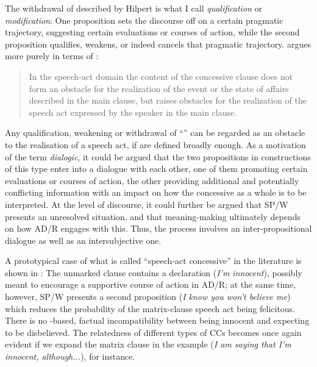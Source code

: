 The withdrawal of  described by Hilpert is what I call \textit{qualification} or \textit{modification}: One proposition sets the discourse off on a certain pragmatic trajectory, suggesting certain evaluations or courses of action, while the second proposition qualifies, weakens, or indeed cancels that pragmatic trajectory. \citet[318]{Crevels2000} argues more purely in terms of :

\begin{quote}
In the speech-act domain the content of the concessive clause does not form an obstacle for the realization of the event or the state of affairs described in the main clause, but raises obstacles for the realization of the speech act expressed by the speaker in the main clause.
\end{quote}

Any qualification, weakening or withdrawal of “” \citep[167]{Hilpert2013a} can be regarded as an obstacle to the realisation of a speech act, if  are defined broadly enough. As a motivation of the term \textit{dialogic}, it could be argued that the two propositions in constructions of this type enter into a dialogue with each other, one of them promoting certain evaluations or courses of action, the other providing additional and potentially conflicting information with an impact on how the concessive as a whole is to be interpreted. At the level of discourse, it could further be argued that SP/W presents an unresolved situation, and that meaning-making ultimately depends on how AD/R engages with this. Thus, the process involves an inter-propositional dialogue as well as an intersubjective one.

A prototypical case of what is called “speech-act concessive” in the literature is shown in : The unmarked clause contains a declaration (\textit{I’m innocent}), possibly meant to encourage a supportive course of action in AD/R; at the same time, however, SP/W presents a second proposition (\textit{I know you won’t believe me}) which reduces the probability of the matrix-clause speech act being felicitous. There is no -based, factual incompatibility between being innocent and expecting to be disbelieved. The relatedness of different types of CCs becomes once again evident if we expand the matrix clause in the example (\textit{I am saying that I’m innocent, although...}), for instance.


